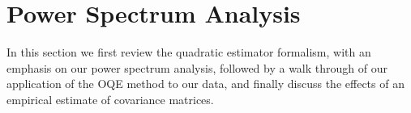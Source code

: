 \documentclass[twocolumn,numberedappendix]{emulateapj} \shorttitle{PSA64}
\begin{document}
\section{Power Spectrum Analysis}\label{sec:oqe}
In this section we first
review the quadratic estimator formalism, with an emphasis on our power
spectrum analysis, followed by a walk through of our application of the OQE
method to our data, and finally discuss the effects of an empirical estimate of
covariance matrices.
\end{document}
